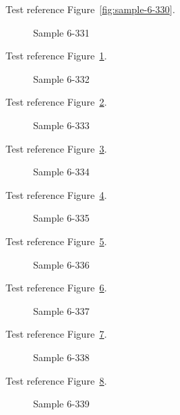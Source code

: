 Test reference Figure~\ref{fig:sample-6-330}.

\begin{figure}[tbhp]
\caption{Sample 6-331}
\label{fig:sample-6-331}
\end{figure}

Test reference Figure~\ref{fig:sample-6-331}.

\begin{figure}[tbhp]
\caption{Sample 6-332}
\label{fig:sample-6-332}
\end{figure}

Test reference Figure~\ref{fig:sample-6-332}.

\begin{figure}[tbhp]
\caption{Sample 6-333}
\label{fig:sample-6-333}
\end{figure}

Test reference Figure~\ref{fig:sample-6-333}.

\begin{figure}[tbhp]
\caption{Sample 6-334}
\label{fig:sample-6-334}
\end{figure}

Test reference Figure~\ref{fig:sample-6-334}.

\begin{figure}[tbhp]
\caption{Sample 6-335}
\label{fig:sample-6-335}
\end{figure}

Test reference Figure~\ref{fig:sample-6-335}.

\begin{figure}[tbhp]
\caption{Sample 6-336}
\label{fig:sample-6-336}
\end{figure}

Test reference Figure~\ref{fig:sample-6-336}.

\begin{figure}[tbhp]
\caption{Sample 6-337}
\label{fig:sample-6-337}
\end{figure}

Test reference Figure~\ref{fig:sample-6-337}.

\begin{figure}[tbhp]
\caption{Sample 6-338}
\label{fig:sample-6-338}
\end{figure}

Test reference Figure~\ref{fig:sample-6-338}.

\begin{figure}[tbhp]
\caption{Sample 6-339}
\label{fig:sample-6-339}
\end{figure}

